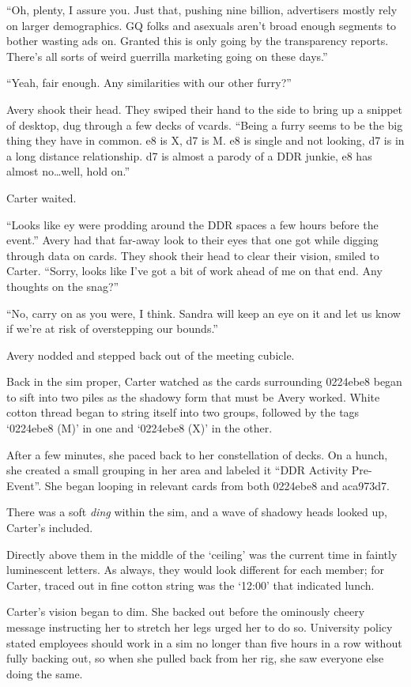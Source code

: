 ``Oh, plenty, I assure you. Just that, pushing nine billion, advertisers mostly rely on larger demographics. GQ folks and asexuals aren't broad enough segments to bother wasting ads on. Granted this is only going by the transparency reports. There's all sorts of weird guerrilla marketing going on these days.''

``Yeah, fair enough. Any similarities with our other furry?''

Avery shook their head. They swiped their hand to the side to bring up a snippet of desktop, dug through a few decks of vcards. ``Being a furry seems to be the big thing they have in common. e8 is X, d7 is M. e8 is single and not looking, d7 is in a long distance relationship. d7 is almost a parody of a DDR junkie, e8 has almost no\ldots{}well, hold on.''

Carter waited.

``Looks like ey were prodding around the DDR spaces a few hours before the event.'' Avery had that far-away look to their eyes that one got while digging through data on cards. They shook their head to clear their vision, smiled to Carter. ``Sorry, looks like I've got a bit of work ahead of me on that end. Any thoughts on the snag?''

``No, carry on as you were, I think. Sandra will keep an eye on it and let us know if we're at risk of overstepping our bounds.''

Avery nodded and stepped back out of the meeting cubicle.

Back in the sim proper, Carter watched as the cards surrounding 0224ebe8 began to sift into two piles as the shadowy form that must be Avery worked. White cotton thread began to string itself into two groups, followed by the tags `0224ebe8 (M)' in one and `0224ebe8 (X)' in the other.

After a few minutes, she paced back to her constellation of decks. On a hunch, she created a small grouping in her area and labeled it ``DDR Activity Pre-Event''. She began looping in relevant cards from both 0224ebe8 and aca973d7.

There was a soft \emph{ding} within the sim, and a wave of shadowy heads looked up, Carter's included.

Directly above them in the middle of the `ceiling' was the current time in faintly luminescent letters. As always, they would look different for each member; for Carter, traced out in fine cotton string was the `12:00' that indicated lunch.

Carter's vision began to dim. She backed out before the ominously cheery message instructing her to stretch her legs urged her to do so. University policy stated employees should work in a sim no longer than five hours in a row without fully backing out, so when she pulled back from her rig, she saw everyone else doing the same.

